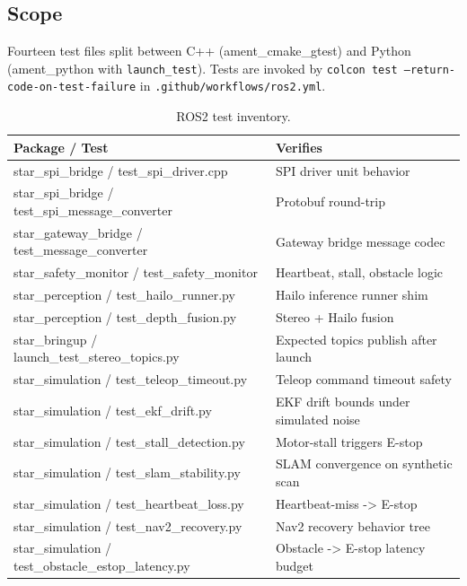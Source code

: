 \documentclass[11pt,letterpaper]{article}
\begin{document}
\subsection{Scope}
Fourteen test files split between C++ (ament\_cmake\_gtest) and
Python (ament\_python with \texttt{launch\_test}). Tests are
invoked by \texttt{colcon test --return-code-on-test-failure} in
\texttt{.github/workflows/ros2.yml}.

\begin{table}[H]
\centering
\caption{ROS2 test inventory.}
\label{tab:ros2-tests}
\small
\begin{tabularx}{\linewidth}{l X}
\toprule
\textbf{Package / Test} & \textbf{Verifies} \\
\midrule
star\_spi\_bridge / test\_spi\_driver.cpp          & SPI driver unit behavior \\
star\_spi\_bridge / test\_spi\_message\_converter  & Protobuf round-trip \\
star\_gateway\_bridge / test\_message\_converter   & Gateway bridge message codec \\
star\_safety\_monitor / test\_safety\_monitor      & Heartbeat, stall, obstacle logic \\
star\_perception / test\_hailo\_runner.py          & Hailo inference runner shim \\
star\_perception / test\_depth\_fusion.py          & Stereo + Hailo fusion \\
star\_bringup / launch\_test\_stereo\_topics.py    & Expected topics publish after launch \\
star\_simulation / test\_teleop\_timeout.py        & Teleop command timeout safety \\
star\_simulation / test\_ekf\_drift.py             & EKF drift bounds under simulated noise \\
star\_simulation / test\_stall\_detection.py       & Motor-stall triggers E-stop \\
star\_simulation / test\_slam\_stability.py        & SLAM convergence on synthetic scan \\
star\_simulation / test\_heartbeat\_loss.py        & Heartbeat-miss -> E-stop \\
star\_simulation / test\_nav2\_recovery.py         & Nav2 recovery behavior tree \\
star\_simulation / test\_obstacle\_estop\_latency.py & Obstacle -> E-stop latency budget \\
\bottomrule
\end{tabularx}
\end{table}
\end{document}
